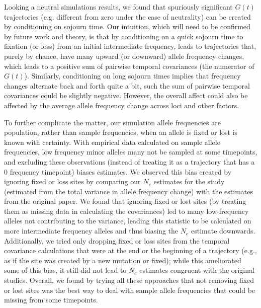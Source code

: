 \documentclass[11pt]{article}
\begin{document}
{{Looking a neutral simulations results, we found that spuriously significant
$G(t)$ trajectories (e.g. different from zero under the case of neutrality) can
be created by conditioning on sojourn time. Our intuition, which will need to
be confirmed by future work and theory, is that by conditioning on a quick
sojourn time to fixation (or loss) from an initial intermediate frequency,
leads to trajectories that, purely by chance, have many upward (or downward)
allele frequency changes, which leads to a positive sum of pairwise temporal
covariances (the numerator of $G(t)$). Similarly, conditioning on long sojourn
times implies that frequency changes alternate back and forth quite a bit, such
the sum of pairwise temporal covariances could be slightly negative. However,
the overall affect could also be affected by the average allele frequency
change across loci and other factors. 

To further complicate the matter, our simulation allele frequencies are
population, rather than sample frequencies, when an allele is fixed or lost is
known with certainty. With empirical data calculated on sample allele
frequencies, low frequency minor alleles many not be sampled at some
timepoints, and excluding these observations (instead of treating it as a
trajectory that has a 0 frequency timepoint) biases estimates.  We observed
this bias created by ignoring fixed or loss sites by comparing our $N_e$
estimates for the \textcite{Barghi2019-qy} study (estimated from the total
variance in allele frequency change) with the estimates from the original
paper. We found that ignoring fixed or lost sites (by treating them as missing
data in calculating the covariances) led to many low-frequency alleles not
contributing to the variance, leading this statistic to be calculated on more
intermediate frequency alleles and thus biasing the $N_e$ estimate downwards.
Additionally, we tried only dropping fixed or loss sites from the temporal
covariance calculations that were at the end or the beginning of a trajectory
(e.g., as if the site was created by a new mutation or fixed); while this
ameliorated some of this bias, it still did not lead to $N_e$ estimates
congruent with the original studies. Overall, we found by trying all these
approaches that not removing fixed or lost sites was the best way to deal with
sample allele frequencies that could be missing from some timepoints. 

}}
\end{document}
